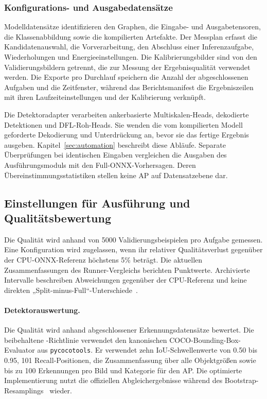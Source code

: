 \subsubsection{Konfigurations- und Ausgabedatensätze}
\label{app:configuration_records}

Modelldatensätze identifizieren den Graphen, die Eingabe- und Ausgabetensoren, die Klassenabbildung sowie die kompilierten Artefakte. Der Messplan erfasst die Kandidatenauswahl, die Vorverarbeitung, den Abschluss einer Inferenzaufgabe, Wiederholungen und Energieeinstellungen. Die Kalibrierungsbilder sind von den Validierungsbildern getrennt, die zur Messung der Ergebnisqualität verwendet werden. Die Exporte pro Durchlauf speichern die Anzahl der abgeschlossenen Aufgaben und die Zeitfenster, während das Berichtsmanifest die Ergebniszeilen mit ihren Laufzeiteinstellungen und der Kalibrierung verknüpft.

Die Detektoradapter verarbeiten ankerbasierte Multiskalen-Heads, dekodierte Detektionen und DFL-Roh-Heads. Sie wenden die vom kompilierten Modell geforderte Dekodierung und Unterdrückung an, bevor sie das fertige Ergebnis ausgeben. Kapitel~\ref{sec:automation} beschreibt diese Abläufe. Separate Überprüfungen bei identischen Eingaben vergleichen die Ausgaben des Ausführungsmoduls mit den Full-ONNX-Vorhersagen. Deren Übereinstimmungsstatistiken stellen keine AP auf Datensatzebene dar.

\subsection{Einstellungen für Ausführung und Qualitätsbewertung}
\label{app:current_deployment_settings}

Die Qualität wird anhand von \num{5000} Validierungsbeispielen pro Aufgabe gemessen. Eine Konfiguration wird zugelassen, wenn ihr relativer Qualitätsverlust gegenüber der CPU-ONNX-Referenz höchstens 5\% beträgt. Die aktuellen Zusammenfassungen des Runner-Vergleichs berichten Punktwerte. Archivierte Intervalle beschreiben Abweichungen gegenüber der CPU-Referenz und keine direkten „Split-minus-Full“-Unterschiede~\cite{mika2026mlsysSplit}.

\paragraph{Detektorauswertung.}
Die Qualität wird anhand abgeschlossener Erkennungsdatensätze bewertet. Die beibehaltene -Richtlinie verwendet den kanonischen COCO-Bounding-Box-Evaluator aus \texttt{pycocotools}. Er verwendet zehn IoU-Schwellenwerte von \num{0.50} bis 0.95, 101 Recall-Positionen, die Zusammenfassung über alle Objektgrößen sowie bis zu 100 Erkennungen pro Bild und Kategorie für den AP. Die optimierte Implementierung nutzt die offiziellen Abgleichergebnisse während des Bootstrap-Resamplings~\cite{cocoapi_cocoeval,edgeAIResults2026} wieder.

